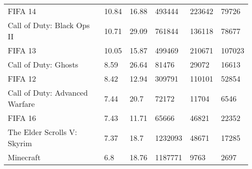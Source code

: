 \begin{table*}[]
\begin{tabular}{llllll}
\multicolumn{1}{l|}{FIFA 14}                         & 10.84           & 16.88          & 493444                & 223642                                                                           & 79726                                                                           \\
\multicolumn{1}{l|}{Call of Duty: Black Ops II}      & 10.71           & 29.09          & 761844                & 136118                                                                           & 78677                                                                           \\
\multicolumn{1}{l|}{FIFA 13}                         & 10.05           & 15.87          & 499469                & 210671                                                                           & 107023                                                                          \\
\multicolumn{1}{l|}{Call of Duty: Ghosts}            & 8.59            & 26.64          & 81476                 & 29072                                                                            & 16613                                                                           \\
\multicolumn{1}{l|}{FIFA 12}                         & 8.42            & 12.94          & 309791                & 110101                                                                           & 52854                                                                           \\
\multicolumn{1}{l|}{Call of Duty: Advanced Warfare}  & 7.44            & 20.7           & 72172                 & 11704                                                                            & 6546                                                                            \\
\multicolumn{1}{l|}{FIFA 16}                         & 7.43            & 11.71          & 65666                 & 46821                                                                            & 22352                                                                           \\
\multicolumn{1}{l|}{The Elder Scrolls V: Skyrim}     & 7.37            & 18.7           & 1232093               & 48671                                                                            & 17285                                                                           \\
\multicolumn{1}{l|}{Minecraft}                       & 6.8             & 18.76          & 1187771               & 9763                                                                             & 2697                                                                            \\

\end{tabular}
\end{table*}
